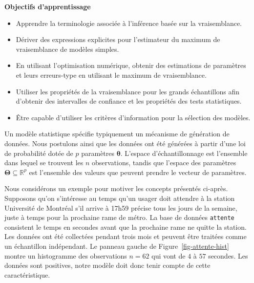 \documentclass[
  11pt,
  letterpaper,
]{scrbook}
\providecommand{\tightlist}{%
  \setlength{\itemsep}{0pt}\setlength{\parskip}{0pt}}\usepackage{longtable,booktabs,array}
\theoremstyle{plain}
\theoremstyle{plain}
\theoremstyle{definition}
\theoremstyle{definition}
\theoremstyle{remark}
\begin{document}
\begin{tcolorbox}[enhanced jigsaw, breakable, colbacktitle=quarto-callout-important-color!10!white, toprule=.15mm, leftrule=.75mm, colframe=quarto-callout-important-color-frame, bottomtitle=1mm, left=2mm, coltitle=black, toptitle=1mm, titlerule=0mm, title=\textcolor{quarto-callout-important-color}{\faExclamation}\hspace{0.5em}{Important}, arc=.35mm, opacitybacktitle=0.6, colback=white, rightrule=.15mm, bottomrule=.15mm, opacityback=0]

\textbf{Objectifs d'apprentissage}

\begin{itemize}
\tightlist
\item
  Apprendre la terminologie associée à l'inférence basée sur la
  vraisemblance.
\item
  Dériver des expressions explicites pour l'estimateur du maximum de
  vraisemblance de modèles simples.
\item
  En utilisant l'optimisation numérique, obtenir des estimations de
  paramètres et leurs erreurs-type en utilisant le maximum de
  vraisemblance.
\item
  Utiliser les propriétés de la vraisemblance pour les grands
  échantillons afin d'obtenir des intervalles de confiance et les
  propriétés des tests statistiques.
\item
  Être capable d'utiliser les critères d'information pour la sélection
  des modèles.
\end{itemize}

\end{tcolorbox}

Un modèle statistique spécifie typiquement un mécanisme de génération de
données. Nous postulons ainsi que les données ont été générées à partir
d'une loi de probabilité dotée de \(p\) paramètres
\(\boldsymbol{\theta}.\) L'espace d'échantillonnage est l'ensemble dans
lequel se trouvent les \(n\) observations, tandis que l'espace des
paramètres \(\boldsymbol{\Theta} \subseteq \mathbb{R}^p\) est l'ensemble
des valeurs que peuvent prendre le vecteur de paramètres.

Nous considérons un exemple pour motiver les concepts présentés
ci-après. Supposons qu'on s'intéresse au temps qu'un usager doit
attendre à la station Université de Montréal s'il arrive à 17h59 précise
tous les jours de la semaine, juste à temps pour la prochaine rame de
métro. La base de données \texttt{attente} consistent le temps en
secondes avant que la prochaine rame ne quitte la station. Les données
ont été collectées pendant trois mois et peuvent être traitées comme un
échantillon indépendant. Le panneau gauche de
Figure~\ref{fig-attente-hist} montre un histogramme des observations
\(n=62\) qui vont de \(4\) à \(57\) secondes. Les données sont
positives, notre modèle doit donc tenir compte de cette caractéristique.
\end{document}
